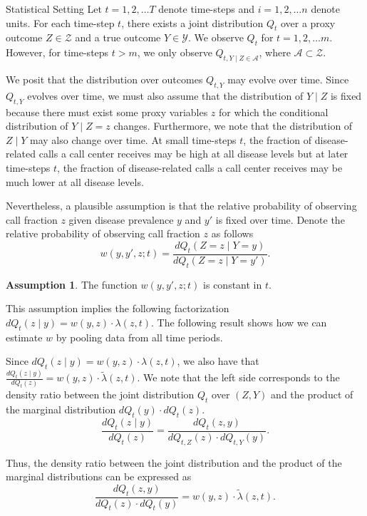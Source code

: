 \documentclass{article}
\theoremstyle{definition}
\newtheorem{assumption}{Assumption}
\theoremstyle{plain}
\theoremstyle{remark}
\begin{document}
\begin{section}{Statistical Setting}
Let $t=1, 2, \dots T$ denote time-steps and $i=1, 2, \dots n$ denote units. For each time-step $t$, there exists a joint distribution $Q_{t}$ over a proxy outcome $Z \in \mathcal{Z}$ and a true outcome $Y \in \mathcal{Y}$. We observe $Q_{t}$ for $t=1, 2, \dots m$. However, for time-steps $t > m$, we only observe $Q_{t, Y \mid Z \in \mathcal{A}}$, where $\mathcal{A} \subset \mathcal{Z}$.

We posit that the distribution over outcomes $Q_{t, Y}$ may evolve over time. Since $Q_{t, Y}$ evolves over time, we must also assume that the distribution of $Y \mid Z$ is fixed because there must exist some proxy variables $z$ for which the conditional distribution of $Y \mid Z=z$ changes. Furthermore, we note that the distribution of $Z \mid Y$ may also change over time. At small time-steps $t$, the fraction of disease-related calls a call center receives may be high at all disease levels but at later time-steps $t$, the fraction of disease-related calls a call center receives may be much lower at all disease levels. 

Nevertheless, a plausible assumption is that the relative probability of observing call fraction $z$ given disease prevalence $y$ and $y'$ is fixed over time. Denote the relative probability of observing call fraction $z$ as follows
\[ w(y, y', z; t) = \frac{dQ_{t}(Z=z \mid Y=y)}{dQ_{t}(Z=z \mid Y=y')}.\]

\begin{assumption}
\label{assumption:stationarity}
The function $w(y, y', z; t)$ is constant in $t$.
\end{assumption}

This assumption implies the following factorization $dQ_{t}(z \mid y) = w(y, z) \cdot \lambda(z, t)$. The following result shows how we can estimate $w$ by pooling data from all time periods.

Since $dQ_{t}(z \mid y) = w(y, z) \cdot \lambda(z, t)$, we also have that $\frac{dQ_{t}(z \mid y)}{dQ_{t}(z)} = w(y, z) \cdot \tilde{\lambda}(z, t).$ We note that the left side corresponds to the density ratio between the joint distribution $Q_{t}$ over $(Z, Y)$ and the product of the marginal distribution $dQ_{t}(y) \cdot dQ_{t}(z).$
\[ \frac{dQ_{t}(z \mid y)}{dQ_{t}(z)}  = \frac{dQ_{t}(z, y)}{dQ_{t, Z}(z) \cdot dQ_{t, Y}(y)}.\]

Thus, the density ratio between the joint distribution and the product of the marginal distributions can be expressed as 
\[  \frac{dQ_{t}(z, y)}{dQ_{t}(z) \cdot dQ_{t}(y)} =  w(y, z) \cdot \tilde{\lambda}(z, t).\]


\end{section}
\end{document}
